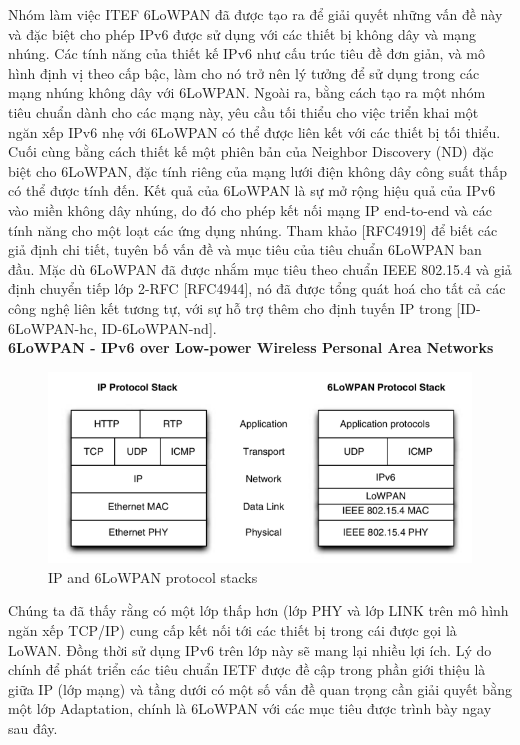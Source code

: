 \documentclass{report}
\begin{document}
Nhóm làm việc ITEF 6LoWPAN đã được tạo ra để giải quyết những vấn đề này
và đặc biệt cho phép IPv6 được sử dụng với các thiết bị không dây và mạng nhúng. Các tính
năng của thiết kế IPv6 như cấu trúc tiêu đề đơn giản, và mô hình định vị theo cấp bậc, làm
cho nó trở nên lý tưởng để sử dụng trong các mạng nhúng không dây với 6LoWPAN. Ngoài ra,
bằng cách tạo ra một nhóm tiêu chuẩn dành cho các mạng này, yêu cầu tối thiểu cho việc triển
khai một ngăn xếp IPv6 nhẹ với 6LoWPAN có thể được liên kết với các thiết bị tối thiểu. Cuối
cùng bằng cách thiết kế một phiên bản của Neighbor Discovery (ND) đặc biệt cho 6LoWPAN,
đặc tính riêng của mạng lưới điện không dây công suất thấp có thể được tính đến. Kết quả
của 6LoWPAN là sự mở rộng hiệu quả của IPv6 vào miền không dây nhúng, do đó cho phép
kết nối mạng IP end-to-end và các tính năng cho một loạt các ứng dụng nhúng. Tham khảo
[RFC4919] để biết các giả định chi tiết, tuyên bố vấn đề và mục tiêu của tiêu chuẩn 6LoWPAN
ban đầu. Mặc dù 6LoWPAN đã được nhắm mục tiêu theo chuẩn IEEE 802.15.4 và giả định
chuyển tiếp lớp 2-RFC [RFC4944], nó đã được tổng quát hoá cho tất cả các công nghệ liên kết
tương tự, với sự hỗ trợ thêm cho định tuyến IP trong [ID-6LoWPAN-hc, ID-6LoWPAN-nd]. \\
\newpage
\textbf{6LoWPAN - IPv6 over Low-power Wireless Personal Area Networks}
\begin{figure}[h]
	\centering
	\includegraphics[scale = 0.7]{fig25.png}
	\caption{IP and 6LoWPAN protocol stacks}
	\label{fig:Graph25}
\end{figure}

Chúng ta đã thấy rằng có một lớp thấp hơn (lớp PHY và lớp LINK trên mô hình ngăn xếp
TCP/IP) cung cấp kết nối tới các thiết bị trong cái được gọi là LoWAN. Đồng thời sử dụng
IPv6 trên lớp này sẽ mang lại nhiều lợi ích. Lý do chính để phát triển các tiêu chuẩn IETF
được đề cập trong phần giới thiệu là giữa IP (lớp mạng) và tầng dưới có một số vấn đề quan
trọng cần giải quyết bằng một lớp Adaptation, chính là 6LoWPAN với các mục tiêu được trình
bày ngay sau đây. \\
\end{document}

